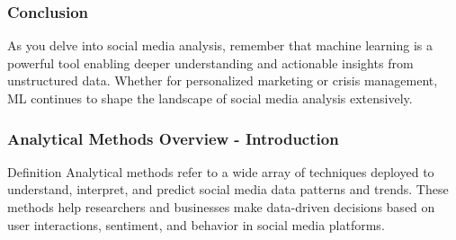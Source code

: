 \documentclass{beamer}
\begin{document}
\begin{frame}[fragile]
    \frametitle{Conclusion}
    As you delve into social media analysis, remember that machine learning is a powerful tool enabling deeper understanding and actionable insights from unstructured data. Whether for personalized marketing or crisis management, ML continues to shape the landscape of social media analysis extensively.
\end{frame}

\begin{frame}[fragile]
    \frametitle{Analytical Methods Overview - Introduction}
    \begin{block}{Definition}
        Analytical methods refer to a wide array of techniques deployed to understand, interpret, and predict social media data patterns and trends. 
        These methods help researchers and businesses make data-driven decisions based on user interactions, sentiment, and behavior in social media platforms.
    \end{block}
\end{frame}
\end{document}
